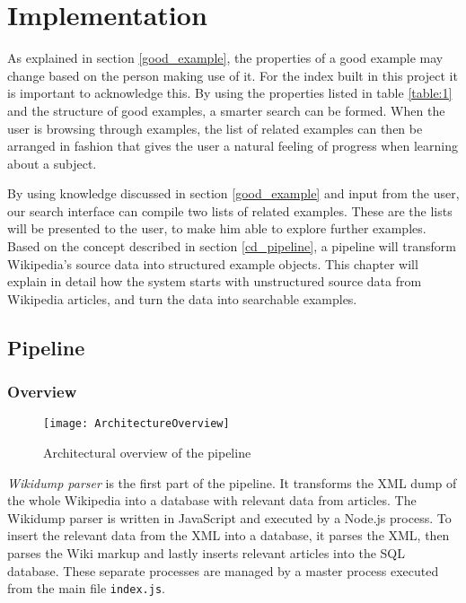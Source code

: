 
\chapter{Implementation}\label{cap_4}

As explained in section \ref{good_example}, the properties of a good example may change based on the person making use of it. For the index built in this project it is important to acknowledge this. By using the properties listed in table \ref{table:1} and the structure of good examples, a smarter search can be formed. When the user is browsing through examples, the list of related examples can then be arranged in fashion that gives the user a natural feeling of progress when learning about a subject.

By using knowledge discussed in section \ref{good_example} and input from the user, our search interface can compile two lists of related examples. These are the lists will be presented to the user, to make him able to explore further examples. Based on the concept described in section \ref{cd_pipeline}, a pipeline will transform Wikipedia's source data into structured example objects. This chapter will explain in detail how the system starts with unstructured source data from Wikipedia articles, and turn the data into searchable examples.

\section{Pipeline}

\subsection{Overview}

\begin{figure}[h]
\caption{Architectural overview of the pipeline}
\texttt{[image: ArchitectureOverview]}
\label{fig:pipeline_arch}
\end{figure}


\textit{Wikidump parser} is the first part of the pipeline. It transforms the XML dump of the whole Wikipedia into a database with relevant data from articles. The Wikidump parser is written in JavaScript and executed by a Node.js process. To insert the relevant data from the XML into a database, it parses the XML, then parses the Wiki markup and lastly inserts relevant articles into the SQL database. These separate processes are managed by a master process executed from the main file \texttt{index.js}.


